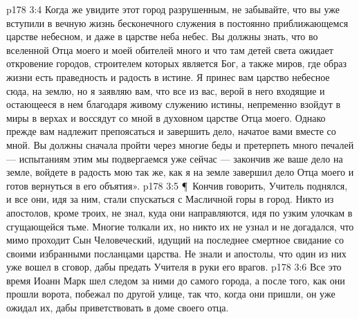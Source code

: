 \vs p178 3:4 Когда же увидите этот город разрушенным, не забывайте, что вы уже вступили в вечную жизнь бесконечного служения в постоянно приближающемся царстве небесном, и даже в царстве неба небес. Вы должны знать, что во вселенной Отца моего и моей обителей много и что там детей света ожидает откровение городов, строителем которых является Бог, а также миров, где образ жизни есть праведность и радость в истине. Я принес вам царство небесное сюда, на землю, но я заявляю вам, что все из вас, верой в него входящие и остающееся в нем благодаря живому служению истины, непременно взойдут в миры в верхах и воссядут со мной в духовном царстве Отца моего. Однако прежде вам надлежит препоясаться и завершить дело, начатое вами вместе со мной. Вы должны сначала пройти через многие беды и претерпеть много печалей --- испытаниям этим мы подвергаемся уже сейчас --- закончив же ваше дело на земле, войдете в радость мою так же, как я на земле завершил дело Отца моего и готов вернуться в его объятия».
\vs p178 3:5 \P\ Кончив говорить, Учитель поднялся, и все они, идя за ним, стали спускаться с Масличной горы в город. Никто из апостолов, кроме троих, не знал, куда они направляются, идя по узким улочкам в сгущающейся тьме. Многие толкали их, но никто их не узнал и не догадался, что мимо проходит Сын Человеческий, идущий на последнее смертное свидание со своими избранными посланцами царства. Не знали и апостолы, что один из них уже вошел в сговор, дабы предать Учителя в руки его врагов.
\vs p178 3:6 Все это время Иоанн Марк шел следом за ними до самого города, а после того, как они прошли ворота, побежал по другой улице, так что, когда они пришли, он уже ожидал их, дабы приветствовать в доме своего отца.
